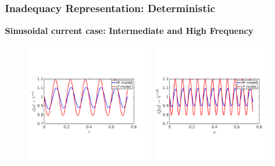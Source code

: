 \documentclass[10pt,xcolor=dvipsnames,compress]{beamer}
\begin{document}
\begin{frame}
\frametitle{Inadequacy Representation: Deterministic}
\textbf{Sinusoidal current case: Intermediate and High Frequency}

\vfill

\vspace{-0.05in}

\begin{figure}
\includegraphics[trim = 0.in  2.3in 0.in 2.8in.in, clip, width=0.45\textwidth]{figs/Isin_int_V_hf_lf.png}
~
\includegraphics[trim = 0.in  2.3in 0.in 2.8in.in, clip, width=0.45\textwidth]{figs/Isin_high_V_hf_lf.png}
\end{figure}

\vspace{-0.18in}


\end{frame}
\end{document}
